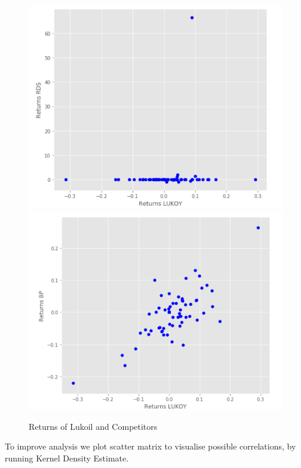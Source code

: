 \documentclass [a4paper, 11pt] {article}
\begin{document}
\begin{figure}[h]
\caption{Returns of Lukoil and Competitors}
\begin{center}
\includegraphics[scale=0.44]{Lukoil_RDS}
\includegraphics[scale=0.44]{Lukoil_BP}
\end{center}
\label{fig:scat1}
\end{figure}

To improve analysis we plot scatter matrix to visualise possible correlations, by running Kernel Density Estimate.
\end{document}
